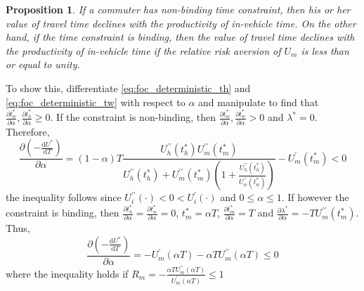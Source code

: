 \documentclass[12pt,a4paper,british]{article}
\makeatletter
\newenvironment{proof}[1][\proofname]{\par
    \normalfont\topsep6\p@\@plus6\p@\relax
    \trivlist
    \itemindent\parindent
    \item[\hskip\labelsep
          \scshape
      #1]\ignorespaces
  }{%
    \endtrivlist\@endpefalse
  }
\providecommand{\proofname}{Proof}
\newtheorem{prop}{Proposition}[section]
\makeatother
\begin{document}
\begin{prop}
If a commuter has non-binding time constraint, then his or her value of travel time declines with the productivity of in-vehicle time. On the other hand, if the time constraint is binding, then the value of travel time declines with the productivity of in-vehicle time if the relative risk aversion of $U_m$ is less than or equal to unity.
\end{prop}


\begin{proof}
To show this, differentiate \eqref{eq:foc_deterministic_th} and \eqref{eq:foc_deterministic_tw} with respect to $\alpha$ and manipulate to find that $\frac{\partial t_{w}^{\ast}}{\partial\alpha} , \frac{\partial t_{h}^{\ast}}{\partial\alpha} \geq 0$. If the constraint is non-binding, then $\frac{\partial t_{w}^{\ast}}{\partial\alpha}, \frac{\partial t_{w}^{\ast}}{\partial\alpha} > 0$ and $\lambda^{\ast} = 0$. Therefore,%
\begin{equation*}
\frac{\partial\left( - \frac{\mathrm{d}U^{\ast}}{\mathrm{d}T}\right)}{\partial\alpha} = \left(1 - \alpha\right) T\frac{U_{h}^{\prime\prime}\left(t_{h}^{\ast}\right) U_{m}^{\prime\prime}\left(t_{m}^{\ast}\right)}{U_{h}^{\prime\prime}\left(t_{h}^{\ast}\right) + U_{m}^{\prime\prime}\left(t_{m}^{\ast}\right)\left(1+\frac{U_{h}^{\prime\prime}\left(t_{h}^{\ast}\right)}{U_{w}^{\prime\prime}\left(t_{w}^{\ast}\right)}\right)}-U_{m}^{\prime}\left(t_{m}^{\ast}\right) < 0
\end{equation*}
the inequality follows since $U_i^{\prime\prime}\left( \cdot \right) <  0 < U_i^{\prime}\left( \cdot \right)$ and $0\leq \alpha \leq 1$. If however the constraint is binding, then $\frac{\partial t_{h}^{\ast}}{\partial\alpha}=\frac{\partial t_{w}^{\ast}}{\partial\alpha} = 0$, $t_m^{\ast} = \alpha T$, $\frac{\partial t_{m}^{\ast}}{\partial\alpha}=T$ and $\frac{\partial\lambda^{\ast}}{\partial\alpha}=-TU_{m}^{\prime\prime}\left(t_{m}^{\ast}\right)$. Thus,%
\begin{equation*}
\frac{\partial\left(-\frac{\mathrm{d}U^{\ast}}{\mathrm{d}T}\right)}{\partial\alpha}= - U_{m}^{\prime}\left(\alpha T \right) - \alpha T U_{m}^{\prime\prime}\left(\alpha T \right) \leq 0
\end{equation*}
where the inequality holds if $R_m = -\frac{\alpha T U_{m}^{\prime\prime}\left(\alpha T \right)}{U_{m}^{\prime}\left(\alpha T \right)} \leq 1$

\end{proof}
\end{document}
